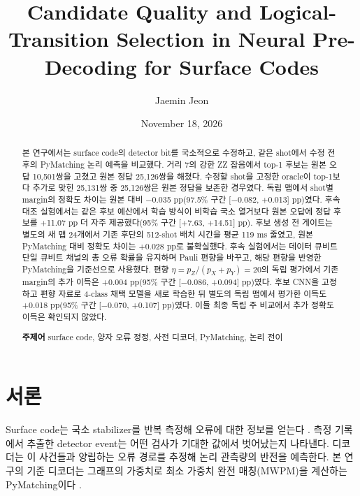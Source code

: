 \documentclass[aps,prd,12pt,twocolumn,superscriptaddress,floatfix]{revtex4-2}
\begin{document}
\title{Candidate Quality and Logical-Transition Selection in Neural Pre-Decoding for Surface Codes}
\author{Jaemin Jeon}
\date{November 18, 2026}

\begin{abstract}

본 연구에서는 surface code의 detector bit를 국소적으로 수정하고, 같은 shot에서 수정 전후의 PyMatching 논리 예측을 비교했다. 거리 7의 강한 ZZ 잡음에서 top-1 후보는 원본 오답 10,501쌍을 고쳤고 원본 정답 25,126쌍을 해쳤다. 수정할 shot을 고정한 oracle이 top-1보다 추가로 맞힌 25,131쌍 중 25,126쌍은 원본 정답을 보존한 경우였다. 독립 맵에서 shot별 margin의 정확도 차이는 원본 대비 \ensuremath{-}0.035 pp(97.5\% 구간 [\ensuremath{-}0.082, +0.013] pp)였다. 후속 대조 실험에서는 같은 후보 예산에서 학습 방식이 비학습 국소 열거보다 원본 오답에 정답 후보를 +11.07 pp 더 자주 제공했다(95\% 구간 [+7.63, +14.51] pp). 후보 생성 전 게이트는 별도의 새 맵 24개에서 기존 후단의 512-shot 배치 시간을 평균 119 ms 줄였고, 원본 PyMatching 대비 정확도 차이는 +0.028 pp로 불확실했다. 후속 실험에서는 데이터 큐비트 단일 큐비트 채널의 총 오류 확률을 유지하며 Pauli 편향을 바꾸고, 해당 편향을 반영한 PyMatching을 기준선으로 사용했다. 편향 \(\eta=p_Z/(p_X+p_Y)=20\)의 독립 평가에서 기존 margin의 추가 이득은 +0.004 pp(95\% 구간 [\ensuremath{-}0.086, +0.094] pp)였다. 후보 CNN을 고정하고 편향 자료로 4-class 채택 모델을 새로 학습한 뒤 별도의 독립 맵에서 평가한 이득도 +0.018 pp(95\% 구간 [\ensuremath{-}0.070, +0.107] pp)였다. 이들 최종 독립 주 비교에서 추가 정확도 이득은 확인되지 않았다.

\textbf{주제어} surface code, 양자 오류 정정, 사전 디코더, PyMatching, 논리 전이

\end{abstract}

\maketitle

\section{서론}

Surface code는 국소 stabilizer를 반복 측정해 오류에 대한 정보를 얻는다 \cite{fowler2012}. 측정 기록에서 추출한 detector event는 어떤 검사가 기대한 값에서 벗어났는지 나타낸다. 디코더는 이 사건들과 양립하는 오류 경로를 추정해 논리 관측량의 반전을 예측한다. 본 연구의 기준 디코더는 그래프의 가중치로 최소 가중치 완전 매칭(MWPM)을 계산하는 PyMatching이다 \cite{higgott2022,sparseblossom2025}.
\end{document}
